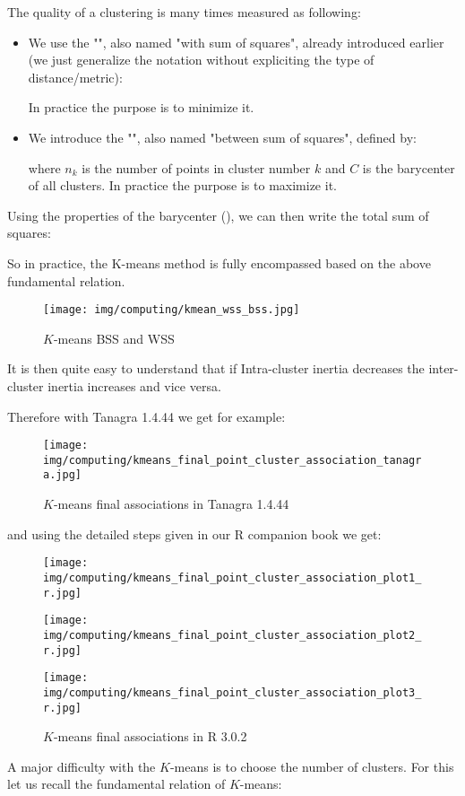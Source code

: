 	The quality of a clustering is many times measured as following:
	\begin{itemize}
		\item We use the "", also named "with sum of squares", already introduced earlier (we just generalize the notation without expliciting the type of distance/metric):
		
		In practice the purpose is to minimize it.
	
		\item We introduce the "", also named "between sum of squares", defined by:
		
		where $n_k$ is the number of points in cluster number $k$ and $C$ is the barycenter of all clusters. In practice the purpose is to maximize it.
	\end{itemize}
	Using the properties of the barycenter (), we can then write the total sum of squares:
	
	So in practice, the K-means method is fully encompassed based on the above fundamental relation.
	\begin{figure}[H]
		\centering
		\texttt{[image: img/computing/kmean\_wss\_bss.jpg]}
		\caption[]{$K$-means BSS and WSS}
	\end{figure}
	It is then quite easy to understand that if Intra-cluster inertia decreases the inter-cluster inertia increases and vice versa.
	
	Therefore with Tanagra 1.4.44 we get for example:
	\begin{figure}[H]
		\centering
		\texttt{[image: img/computing/kmeans\_final\_point\_cluster\_association\_tanagra.jpg]}
		\caption[]{$K$-means final associations in Tanagra 1.4.44}
	\end{figure}
	and using the detailed steps given in our R companion book we get:
	\begin{figure}[H]
		\centering
		\texttt{[image: img/computing/kmeans\_final\_point\_cluster\_association\_plot1\_r.jpg]}
	\end{figure}
	\begin{figure}[H]
		\centering
		\texttt{[image: img/computing/kmeans\_final\_point\_cluster\_association\_plot2\_r.jpg]}
	\end{figure}
	\begin{figure}[H]
		\centering
		\texttt{[image: img/computing/kmeans\_final\_point\_cluster\_association\_plot3\_r.jpg]}
		\caption[]{$K$-means final associations in R 3.0.2}
	\end{figure}
	A major difficulty with the $K$-means is to choose the number of clusters. For this let us recall the fundamental relation of $K$-means:
	
